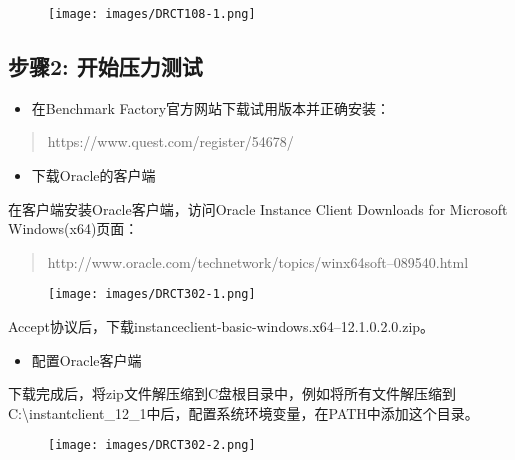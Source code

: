 \begin{figure}[htbp]
\centering
\texttt{[image: images/DRCT108-1.png]}
\end{figure}

\subsection{步骤2: 开始压力测试}
\label{步骤2:开始压力测试}

\begin{itemize}
\item 在Benchmark Factory官方网站下载试用版本并正确安装：

\end{itemize}

\begin{quote}

https:\slash \slash www.quest.com\slash register\slash 54678\slash 
\end{quote}

\begin{itemize}
\item 下载Oracle的客户端

\end{itemize}

在客户端安装Oracle客户端，访问Oracle Instance Client Downloads for Microsoft Windows(x64)页面：

\begin{quote}

http:\slash \slash www.oracle.com\slash technetwork\slash topics\slash winx64soft--089540.html
\end{quote}

\begin{figure}[htbp]
\centering
\texttt{[image: images/DRCT302-1.png]}
\end{figure}

Accept协议后，下载instanceclient-basic-windows.x64--12.1.0.2.0.zip。

\begin{itemize}
\item 配置Oracle客户端

\end{itemize}

下载完成后，将zip文件解压缩到C盘根目录中，例如将所有文件解压缩到C:\textbackslash{}instantclient\_12\_1中后，配置系统环境变量，在PATH中添加这个目录。

\begin{figure}[htbp]
\centering
\texttt{[image: images/DRCT302-2.png]}
\end{figure}

